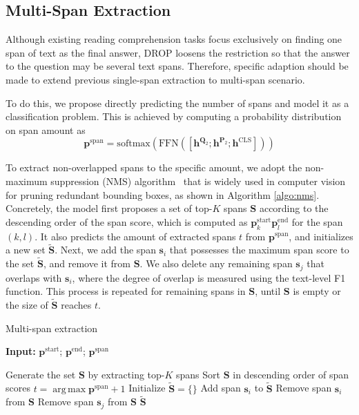 \documentclass[11pt,a4paper]{article}
\DeclareMathOperator*{\argmax}{arg\,max}
\begin{document}
\subsection{Multi-Span Extraction	\label{sec:multi-span}}
Although existing reading comprehension tasks focus exclusively on finding one span of text as the final answer, DROP loosens the restriction so that the answer to the question may be several text spans. 
Therefore, specific adaption should be made to extend previous single-span extraction to multi-span scenario.

To do this, we propose directly predicting the number of spans and model it as a classification problem. 
This is achieved by computing a probability distribution on span amount as
\begin{equation}
	\mathbf{p}^{\mathrm{span}} = \mathrm{softmax}(\mathrm{FFN}([\mathbf{h}^{\mathbf{Q}_2}; \mathbf{h}^{\mathbf{P}_2}; \mathbf{h}^{\mathrm{CLS}}])) \nonumber
\end{equation}

To extract non-overlapped spans to the specific amount, we adopt the non-maximum suppression (NMS) algorithm~\cite{rosenfeld1971edge} that is widely used in computer vision for pruning redundant bounding boxes, as shown in Algorithm \ref{algo:nms}.
Concretely, the model first proposes a set of top-$K$ spans $\mathbf{S}$ according to the descending order of the span score, which is computed as $\mathbf{p}^\mathrm{start}_k \mathbf{p}^\mathrm{end}_l$ for the span $(k, l)$.
It also predicts the amount of extracted spans $t$ from $\mathbf{p}^{\mathrm{span}}$, and initializes a new set $\tilde{\mathbf{S}}$.
Next, we add the span $\mathbf{s}_i$ that possesses the maximum span score to the set $\tilde{\mathbf{S}}$, and remove it from $\mathbf{S}$. 
We also delete any remaining span $\mathbf{s}_j$ that overlaps with $\mathbf{s}_i$, where the degree of overlap is measured using the text-level F1 function. 
This process is repeated for remaining spans in $\mathbf{S}$, until $\mathbf{S}$ is empty or the size of $\tilde{\mathbf{S}}$ reaches $t$. 

\begin{algorithm}[h]
\small
\caption{Multi-span extraction} \label{algo:nms}
{\bf Input:} $\mathbf{p}^\mathrm{start}$; $\mathbf{p}^\mathrm{end}$; $\mathbf{p}^{\mathrm{span}}$
\begin{algorithmic}[1]
\State Generate the set $\mathbf{S}$ by extracting top-$K$ spans
\State Sort $\mathbf{S}$ in descending order of span scores
\State $t = \argmax \mathbf{p}^{\mathrm{span}} + 1$
\State Initialize $\tilde{\mathbf{S}} = \{\}$  
		\State Add span $\mathbf{s}_i$ to $\tilde{\mathbf{S}}$
		\State Remove span $\mathbf{s}_i$ from $\mathbf{S}$
				\State Remove span $\mathbf{s}_j$ from $\mathbf{S}$
			\EndIf
		\EndFor
	\EndFor
\EndWhile
\State \Return $\tilde{\mathbf{S}}$
\end{algorithmic}
\end{algorithm}
\end{document}
